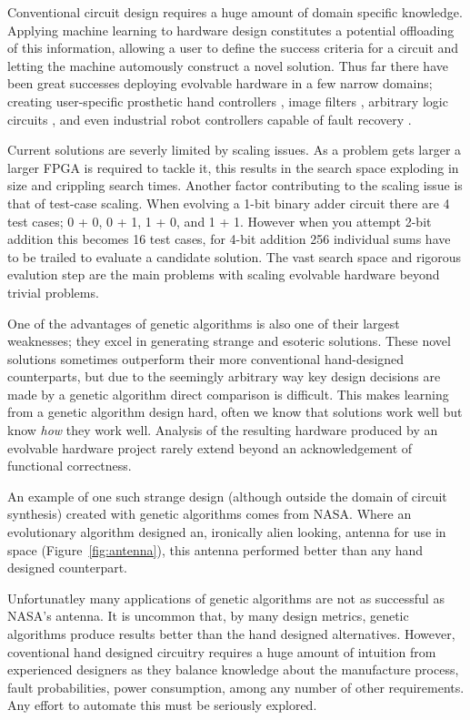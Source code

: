 Conventional circuit design requires a huge amount of domain specific knowledge.
Applying machine learning to hardware design constitutes a potential
offloading of this information, allowing a user to define the success
criteria for a circuit and letting the machine automously construct a novel solution.
Thus far there have been great successes deploying evolvable hardware in a few
narrow domains; creating
user-specific prosthetic hand controllers \cite{Kajitani1999AnEH},
image filters \cite{HybridFilter}, arbitrary logic circuits
\cite{Vasicek2011}, and even industrial robot controllers capable of fault recovery \cite{10.1007/3-540-61093-6_6}.

Current solutions are severly limited by scaling issues. As a problem
gets larger a larger FPGA is required to tackle it, this results in the
search space exploding in size and crippling search times. Another factor
contributing to the scaling issue is that of test-case scaling. When evolving
a 1-bit binary adder circuit there are 4 test cases; 0 + 0, 0 + 1, 1 + 0, and
1 + 1. However when you attempt 2-bit addition this becomes 16 test cases,
for 4-bit addition 256 individual sums have to be trailed to evaluate a
candidate solution.
The vast search space and rigorous evalution step
are the main problems with scaling evolvable hardware beyond trivial problems.

One of the advantages of genetic algorithms is also one of their largest
weaknesses; they excel in generating strange and esoteric solutions.
These novel solutions sometimes
outperform their more conventional hand-designed counterparts,
but due to the seemingly arbitrary way key design decisions are made
by a genetic algorithm direct comparison is difficult. This makes
learning from a genetic algorithm design hard, often we know that solutions
work well but know {\em how} they work well. Analysis of the resulting hardware
produced by an evolvable hardware project rarely
extend beyond an acknowledgement of functional correctness.

An example of one such strange design
(although outside the domain of circuit synthesis)
created with genetic algorithms
comes from NASA. Where an evolutionary algorithm designed an, ironically
alien looking, antenna for use in space (Figure~\ref{fig:antenna})\cite{Antenna}, this antenna performed better
than any hand designed counterpart.

Unfortunatley many applications of genetic algorithms are not as
successful as NASA's antenna.
It is uncommon that, by many design metrics, genetic algorithms produce results
better than the hand designed alternatives. However, coventional hand designed
circuitry requires
a huge amount of intuition from experienced designers as they balance
knowledge about the manufacture process, fault probabilities, power
consumption, among any number of other requirements. Any effort to automate
this must be seriously explored.

